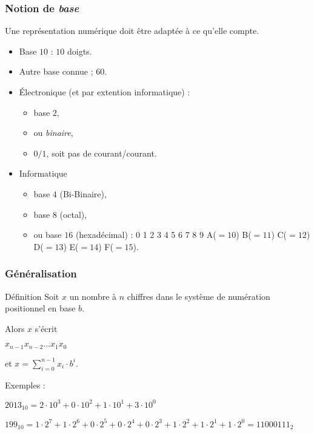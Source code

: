 	\frame
	{
		\frametitle{Notion de \emph{base}}
		
		Une repr\'esentation num\'erique doit \^etre adapt\'ee \`a ce qu'elle compte.
		\begin{itemize}
			\item<2-> Base $10$ : $10$ doigts.
			\item<3-> Autre base connue ;  $60$.
			\item<4-> \'Electronique (et par extention informatique) :
			\begin{itemize}
				\item<5-> base $2$,
				\item<6-> ou \emph{binaire},
				\item<7-> $0/1$, soit pas de courant/courant.
			\end{itemize}
			\item<8-> Informatique
			\begin{itemize}
				\item<9-> base $4$ (Bi-Binaire),
				\item<10-> base $8$ (octal),
				\item<11-> ou base $16$ (hexad\'ecimal) : 0 1 2 3 4 5 6 7 8 9 A($=10$) B($=11$) C($=12$) D($=13$) E($=14$) F($=15$).
			\end{itemize}
		\end{itemize}
	}
	
	\frame
	{
		\frametitle{G\'en\'eralisation}
		\begin{block}{D\'efinition}
			Soit $x$ un nombre \`a $n$ chiffres dans le syst\`eme de num\'eration positionnel en base $b$.
			
			Alors $x$ s'\'ecrit
			
			$x_{n-1}x_{n-2}\ldots x_1x_0$
			
			et $x=\sum\limits_{i = 0}^{n-1}x_i\cdot b^i$.
		\end{block}
		
		Exemples :
		\begin{description}
			\item<2-> $2013_{10} = 2\cdot10^3 + 0\cdot10^2 + 1\cdot10^1+3\cdot10^0$
			\item<3-> $199_{10} = 1\cdot2^7 + 1\cdot2^6 + 0\cdot2^5+0\cdot2^4 + 0\cdot2^3 + 1\cdot2^2 + 1\cdot2^1+1\cdot2^0 = 11000111_2$
		\end{description}
	}

